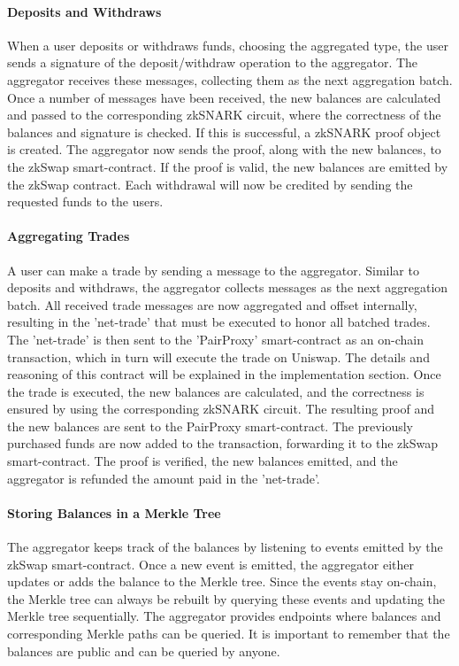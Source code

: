 \documentclass[../../thesis.tex]{subfiles}
\begin{document}
\paragraph{Deposits and Withdraws}
When a user deposits or withdraws funds, choosing the aggregated type, the user sends a signature of the deposit/withdraw operation to the aggregator. The aggregator receives these messages, collecting them as the next aggregation batch. Once a number of messages have been received, the new balances are calculated and passed to the corresponding zkSNARK circuit, where the correctness of the balances and signature is checked. If this is successful, a zkSNARK proof object is created. The aggregator now sends the proof, along with the new balances, to the zkSwap smart-contract. If the proof is valid, the new balances are emitted by the zkSwap contract. Each withdrawal will now be credited by sending the requested funds to the users. 

\paragraph{Aggregating Trades}
A user can make a trade by sending a message to the aggregator. Similar to deposits and withdraws, the aggregator collects messages as the next aggregation batch. All received trade messages are now aggregated and offset internally, resulting in the 'net-trade' that must be executed to honor all batched trades. The 'net-trade' is then sent to the 'PairProxy' smart-contract as an on-chain transaction, which in turn will execute the trade on Uniswap. The details and reasoning of this contract will be explained in the implementation section. Once the trade is executed, the new balances are calculated, and the correctness is ensured by using the corresponding zkSNARK circuit. The resulting proof and the new balances are sent to the PairProxy smart-contract. The previously purchased funds are now added to the transaction, forwarding it to the zkSwap smart-contract. The proof is verified, the new balances emitted, and the aggregator is refunded the amount paid in the 'net-trade'. 

\paragraph{Storing Balances in a Merkle Tree}
The aggregator keeps track of the balances by listening to events emitted by the zkSwap smart-contract. Once a new event is emitted, the aggregator either updates or adds the balance to the Merkle tree. Since the events stay on-chain, the Merkle tree can always be rebuilt by querying these events and updating the Merkle tree sequentially. The aggregator provides endpoints where balances and corresponding Merkle paths can be queried. It is important to remember that the balances are public and can be queried by anyone.
\end{document}
